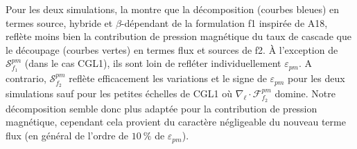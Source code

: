 Pour les deux simulations, la  montre que la décomposition (courbes bleues) en termes source, hybride et $\beta$-dépendant de la formulation f1 inspirée de A18, reflète moins bien la contribution de pression magnétique du taux de cascade que le découpage (courbes vertes) en termes flux et sources de f2. À l'exception de $\mathcal{S}^{pm}_{f_1}$ (dans le cas CGL1), ils sont loin de refléter individuellement $\varepsilon_{pm}$. A contrario,  $\mathcal{S}^{pm}_{f_2}$ reflète efficacement les variations et le signe de $\varepsilon_{pm}$ pour les deux simulations sauf pour les petites échelles de CGL1 où $\nabla_{\boldsymbol{\ell}} \cdot \mathcal{F}^{pm}_{f_2}$ domine. Notre décomposition semble donc plus adaptée pour la contribution de pression magnétique, cependant cela provient du caractère négligeable du nouveau terme flux (en général de l'ordre de $\SI{10}{\%}$ de $\varepsilon_{pm}$). 

